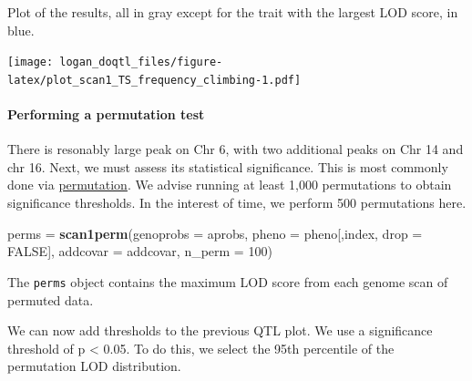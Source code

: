 \documentclass[]{article}
\newenvironment{Shaded}{\begin{snugshade}}{\end{snugshade}}
\newcommand{\KeywordTok}[1]{\textcolor[rgb]{0.13,0.29,0.53}{\textbf{#1}}}
\newcommand{\DataTypeTok}[1]{\textcolor[rgb]{0.13,0.29,0.53}{#1}}
\newcommand{\DecValTok}[1]{\textcolor[rgb]{0.00,0.00,0.81}{#1}}
\newcommand{\StringTok}[1]{\textcolor[rgb]{0.31,0.60,0.02}{#1}}
\newcommand{\OtherTok}[1]{\textcolor[rgb]{0.56,0.35,0.01}{#1}}
\newcommand{\OperatorTok}[1]{\textcolor[rgb]{0.81,0.36,0.00}{\textbf{#1}}}
\newcommand{\NormalTok}[1]{#1}
\let\oldparagraph\paragraph
\renewcommand{\paragraph}[1]{\oldparagraph{#1}\mbox{}}
\begin{document}
Plot of the results, all in gray except for the trait with the largest
LOD score, in blue.

\begin{Shaded}
\end{Shaded}

\texttt{[image: logan\_doqtl\_files/figure-latex/plot\_scan1\_TS\_frequency\_climbing-1.pdf]}

\paragraph{Performing a permutation
test}\label{performing-a-permutation-test}

There is resonably large peak on Chr 6, with two additional peaks on Chr
14 and chr 16. Next, we must assess its statistical significance. This
is most commonly done via
\href{http://www.genetics.org/content/178/1/609.long}{permutation}. We
advise running at least 1,000 permutations to obtain significance
thresholds. In the interest of time, we perform 500 permutations here.

\begin{Shaded}
\begin{Highlighting}[]
\NormalTok{perms =}\StringTok{ }\KeywordTok{scan1perm}\NormalTok{(}\DataTypeTok{genoprobs =}\NormalTok{ aprobs, }\DataTypeTok{pheno =}\NormalTok{ pheno[,index, }\DataTypeTok{drop =} \OtherTok{FALSE}\NormalTok{], }\DataTypeTok{addcovar =}\NormalTok{ addcovar, }\DataTypeTok{n_perm =} \DecValTok{100}\NormalTok{)}
\end{Highlighting}
\end{Shaded}

The \texttt{perms} object contains the maximum LOD score from each
genome scan of permuted data.

We can now add thresholds to the previous QTL plot. We use a
significance threshold of p \textless{} 0.05. To do this, we select the
95th percentile of the permutation LOD distribution.
\end{document}
